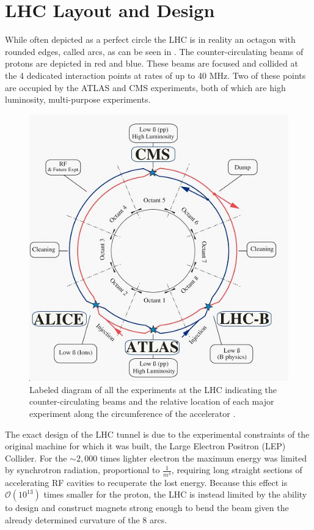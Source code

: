 \section{LHC Layout and Design} \label{sec:lhc:layout}

While often depicted as a perfect circle the LHC is in reality an octagon with
rounded edges, called arcs, as can be seen in .
The counter-circulating beams of protons are depicted in red and
blue.  These beams are focused and collided at the 4 dedicated interaction
points at rates of up to 40 MHz.  Two of these points are occupied by the
ATLAS and CMS experiments, both of which are high luminosity, multi-purpose
experiments.

\begin{figure}[!htbp] 
  \begin{center}
    \includegraphics[width=0.9\linewidth]{figures/lhc/lhc_schematic.jpg}
    \caption{Labeled diagram of all the experiments at the LHC indicating the
counter-circulating beams and the relative location of each major experiment
along the circumference of the accelerator \cite{BATTISTONI:2011ujk}.} 
    \label{fig:lhc_schematic} 
  \end{center} 
\end{figure}

The exact design of the LHC tunnel is due to the experimental constraints of the
original machine for which it was built, the Large Electron Positron (LEP)
Collider.  For the $\sim 2,000$ times lighter electron the maximum energy was
limited by synchrotron radiation, proportional to $\frac{1}{m^4}$, requiring
long straight sections of accelerating RF cavities to recuperate the lost
energy.  Because this effect is $\mathcal{O}(10^{13})$ times smaller for the
proton, the LHC is instead limited by the ability to design and construct magnets
strong enough to bend the beam given the already determined curvature of the 8
arcs.

